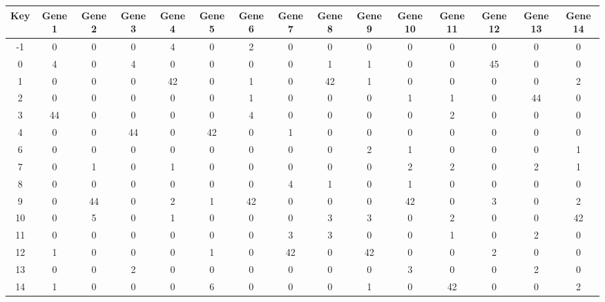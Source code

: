 \begin{tabular}{|c|c|c|c|c|c|c|c|c|c|c|c|c|c|c|}
\hline
Key & Gene 1 & Gene 2 & Gene 3 & Gene 4 & Gene 5 & Gene 6 & Gene 7 & Gene 8 & Gene 9 & Gene 10 & Gene 11 & Gene 12 & Gene 13 & Gene 14 \\
\hline
-1 & 0 & 0 & 0 & 4 & 0 & 2 & 0 & 0 & 0 & 0 & 0 & 0 & 0 & 0 \\
0 & 4 & 0 & 4 & 0 & 0 & 0 & 0 & 1 & 1 & 0 & 0 & 45 & 0 & 0 \\
1 & 0 & 0 & 0 & 42 & 0 & 1 & 0 & 42 & 1 & 0 & 0 & 0 & 0 & 2 \\
2 & 0 & 0 & 0 & 0 & 0 & 1 & 0 & 0 & 0 & 1 & 1 & 0 & 44 & 0 \\
3 & 44 & 0 & 0 & 0 & 0 & 4 & 0 & 0 & 0 & 0 & 2 & 0 & 0 & 0 \\
4 & 0 & 0 & 44 & 0 & 42 & 0 & 1 & 0 & 0 & 0 & 0 & 0 & 0 & 0 \\
6 & 0 & 0 & 0 & 0 & 0 & 0 & 0 & 0 & 2 & 1 & 0 & 0 & 0 & 1 \\
7 & 0 & 1 & 0 & 1 & 0 & 0 & 0 & 0 & 0 & 2 & 2 & 0 & 2 & 1 \\
8 & 0 & 0 & 0 & 0 & 0 & 0 & 4 & 1 & 0 & 1 & 0 & 0 & 0 & 0 \\
9 & 0 & 44 & 0 & 2 & 1 & 42 & 0 & 0 & 0 & 42 & 0 & 3 & 0 & 2 \\
10 & 0 & 5 & 0 & 1 & 0 & 0 & 0 & 3 & 3 & 0 & 2 & 0 & 0 & 42 \\
11 & 0 & 0 & 0 & 0 & 0 & 0 & 3 & 3 & 0 & 0 & 1 & 0 & 2 & 0 \\
12 & 1 & 0 & 0 & 0 & 1 & 0 & 42 & 0 & 42 & 0 & 0 & 2 & 0 & 0 \\
13 & 0 & 0 & 2 & 0 & 0 & 0 & 0 & 0 & 0 & 3 & 0 & 0 & 2 & 0 \\
14 & 1 & 0 & 0 & 0 & 6 & 0 & 0 & 0 & 1 & 0 & 42 & 0 & 0 & 2 \\
\hline
\end{tabular}